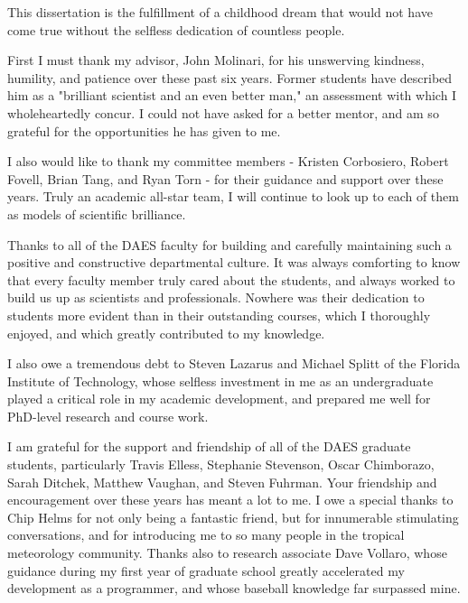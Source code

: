  


This dissertation is the fulfillment of a childhood dream that would not have come true without the selfless dedication of countless people.

First I must thank my advisor, John Molinari, for his unswerving kindness, humility, and patience over these past six years.  
Former students have described him as a "brilliant scientist and an even better man," an assessment with which I wholeheartedly concur.  
I could not have asked for a better mentor, and am so grateful for the opportunities he has given to me.

I also would like to thank my committee members - Kristen Corbosiero, Robert Fovell, Brian Tang, and Ryan Torn - for their guidance and support over these years.  
Truly an academic all-star team, I will continue to look up to each of them as models of scientific brilliance.

Thanks to all of the DAES faculty for building and carefully maintaining such a positive and constructive departmental culture.  
It was always comforting to know that every faculty member truly cared about the students, and always worked to build us up as scientists and professionals.  
Nowhere was their dedication to students more evident than in their outstanding courses, which I thoroughly enjoyed, and which greatly contributed to my knowledge.  

I also owe a tremendous debt to Steven Lazarus and Michael Splitt of the Florida Institute of Technology, whose selfless investment in me as an undergraduate played a critical role in my academic development, and prepared me well for PhD-level research and course work.

I am grateful for the support and friendship of all of the DAES graduate students, particularly Travis Elless, Stephanie Stevenson, Oscar Chimborazo, Sarah Ditchek, Matthew Vaughan, and Steven Fuhrman.  
Your friendship and encouragement over these years has meant a lot to me.
I owe a special thanks to Chip Helms for not only being a fantastic friend, but for innumerable stimulating conversations, and for introducing me to so many people in the tropical meteorology community.  
Thanks also to research associate Dave Vollaro, whose guidance during my first year of graduate school greatly accelerated my development as a programmer, and whose baseball knowledge far surpassed mine.

